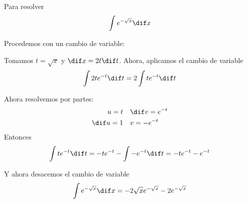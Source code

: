 \documentclass[a4paper]{article}
\begin{document}
Para resolver 
\[
	\int e^{-\sqrt{x}} \dif x
\]

Procedemos con un cambio de variable:

Tomamos $t = \sqrt{x}$ y $\dif x = 2 t \dif t$. Ahora, aplicamos el cambio de variable
\[
	\int 2t e^{-t} \dif t = 2 \int t e^{-t} \dif t
\]

Ahora resolvemos por partes:
\[
	\begin{aligned}
		u = t &\quad \dif v = e^{-t} \\
		\dif u = 1 &\quad v = -e^{-t}
	\end{aligned}
\]
Entonces
\[
	\int t e^{-t} \dif t = -te^{-t} - \int -e^{-t} \dif t = -te^{-t} - e^{-t}
\]

Y ahora desacemos el cambio de variable
\[
	\int e^{-\sqrt{x}} \dif x = -2\sqrt{x}e^{-\sqrt{x}} - 2e^{-\sqrt{x}}
\]
\end{document}
